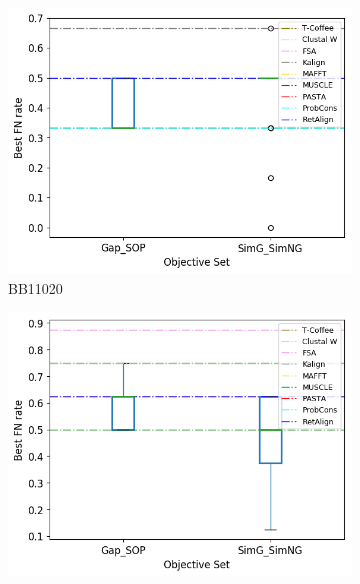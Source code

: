 \begin{figure}[!htbp]
\begin{adjustwidth}{-1cm}{-1cm}
\begin{subfigure}{0.22\textwidth}
	\end{subfigure}
	\begin{subfigure}{0.22\textwidth}
		\includegraphics[width=\columnwidth]{Figure/summary/precomputedInit/Balibase/BB11020_objset_fnrate_rank}
		\caption{BB11020}
	\end{subfigure}
	\begin{subfigure}{0.22\textwidth}
		\includegraphics[width=\columnwidth]{Figure/summary/precomputedInit/Balibase/BB11033_objset_fnrate_rank}

\end{subfigure}
\end{adjustwidth}
\end{figure}
